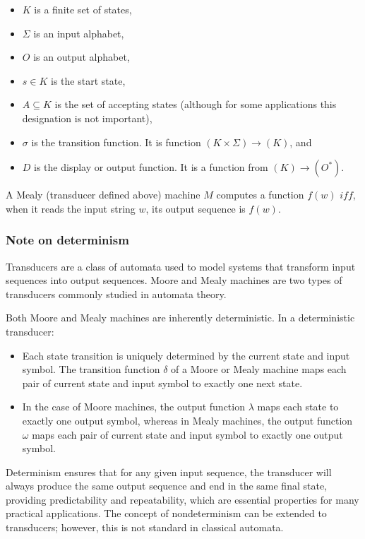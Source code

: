 \documentclass[hidelinks,12pt]{article}
\begin{document}
\begin{itemize}
	\item $K$ is a finite set of states,
	\item $\Sigma$ is an input alphabet,
	\item $O$ is an output alphabet,
	\item $s \in K$ is the start state,
	\item $A \subseteq K $ is the set of accepting states (although for some applications this designation is not important),
	\item $\sigma$ is the transition function. It is function $(K \times \Sigma) \to (K)$, and
	\item $D$ is the display or output function. It is a function from $(K) \to (O^*)$.
\end{itemize}

A Mealy (transducer defined above) machine $M$ computes a function $f(w)$ $
iff$, when it reads the input string $w$, its output sequence is $f(w)$. 

\subsubsection{Note on determinism}

Transducers are a class of automata used to model systems that transform input
sequences into output sequences. Moore and Mealy machines are two types of
transducers commonly studied in automata theory.

Both Moore and Mealy machines are inherently deterministic. In a deterministic
transducer:

\begin{itemize}
  \item Each state transition is uniquely determined by the current state and input symbol. The transition function $\delta$ of a Moore or Mealy machine maps each pair of current state and input symbol to exactly one next state.
  \item In the case of Moore machines, the output function $\lambda$ maps each state to exactly one output symbol, whereas in Mealy machines, the output function $\omega$ maps each pair of current state and input symbol to exactly one output symbol.
\end{itemize}

Determinism ensures that for any given input sequence, the transducer will
always produce the same output sequence and end in the same final state,
providing predictability and repeatability, which are essential properties for
many practical applications.
The concept of nondeterminism can be extended to transducers; however, this is not standard in classical automata.
\end{document}
